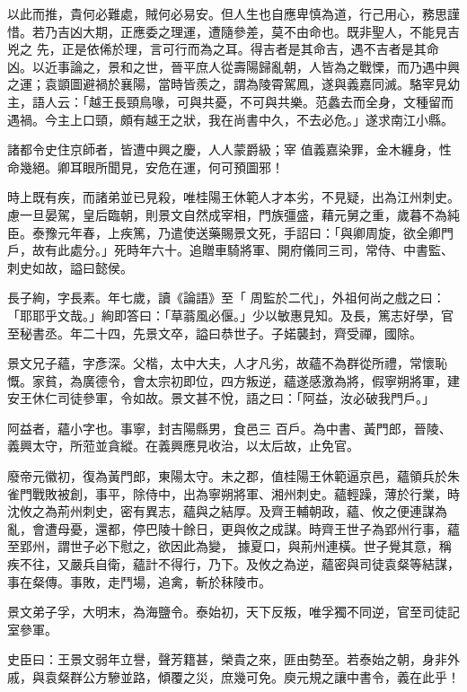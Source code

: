 \begin{pinyinscope}
 以此而推，貴何必難處，賊何必易安。但人生也自應卑慎為道，行己用心，務思謹惜。若乃吉凶大期，正應委之理運，遭隨參差，莫不由命也。既非聖人，不能見吉兇之
 先，正是依俙於理，言可行而為之耳。得吉者是其命吉，遇不吉者是其命凶。以近事論之，景和之世，晉平庶人從壽陽歸亂朝，人皆為之戰慄，而乃遇中興之運；袁顗圖避禍於襄陽，當時皆羨之，謂為陵霄駕鳳，遂與義嘉同滅。駱宰見幼主，語人云：「越王長頸鳥喙，可與共憂，不可與共樂。范蠡去而全身，文種留而遇禍。今主上口頸，頗有越王之狀，我在尚書中久，不去必危。」遂求南江小縣。



 諸都令史住京師者，皆遭中興之慶，人人蒙爵級；宰
 值義嘉染罪，金木纏身，性命幾絕。卿耳眼所聞見，安危在運，何可預圖邪！



 時上既有疾，而諸弟並已見殺，唯桂陽王休範人才本劣，不見疑，出為江州刺史。慮一旦晏駕，皇后臨朝，則景文自然成宰相，門族彊盛，藉元舅之重，歲暮不為純臣。泰豫元年春，上疾篤，乃遣使送藥賜景文死，手詔曰：「與卿周旋，欲全卿門戶，故有此處分。」死時年六十。追贈車騎將軍、開府儀同三司，常侍、中書監、刺史如故，謚曰懿侯。



 長子絢，字長素。年七歲，讀《論語》至「
 周監於二代」，外祖何尚之戲之曰：「耶耶乎文哉。」絢即答曰：「草蓊風必偃。」少以敏惠見知。及長，篤志好學，官至秘書丞。年二十四，先景文卒，謚曰恭世子。子婼襲封，齊受禪，國除。



 景文兄子蘊，字彥深。父楷，太中大夫，人才凡劣，故蘊不為群從所禮，常懷恥慨。家貧，為廣德令，會太宗初即位，四方叛逆，蘊遂感激為將，假寧朔將軍，建安王休仁司徒參軍，令如故。景文甚不悅，語之曰：「阿益，汝必破我門戶。」



 阿益者，蘊小字也。事寧，封吉陽縣男，食邑三
 百戶。為中書、黃門郎，晉陵、義興太守，所蒞並貪縱。在義興應見收治，以太后故，止免官。



 廢帝元徽初，復為黃門郎，東陽太守。未之郡，值桂陽王休範逼京邑，蘊領兵於朱雀門戰敗被創，事平，除侍中，出為寧朔將軍、湘州刺史。蘊輕躁，薄於行業，時沈攸之為荊州刺史，密有異志，蘊與之結厚。及齊王輔朝政，蘊、攸之便連謀為亂，會遭母憂，還都，停巴陵十餘日，更與攸之成謀。時齊王世子為郢州行事，蘊至郢州，謂世子必下慰之，欲因此為變，
 據夏口，與荊州連橫。世子覺其意，稱疾不往，又嚴兵自衛，蘊計不得行，乃下。及攸之為逆，蘊密與司徒袁粲等結謀，事在粲傳。事敗，走鬥場，追禽，斬於秣陵市。



 景文弟子孚，大明末，為海鹽令。泰始初，天下反叛，唯孚獨不同逆，官至司徒記室參軍。



 史臣曰：王景文弱年立譽，聲芳籍甚，榮貴之來，匪由勢至。若泰始之朝，身非外戚，與袁粲群公方驂並路，傾覆之災，庶幾可免。庾元規之讓中書令，義在此乎！



\end{pinyinscope}
